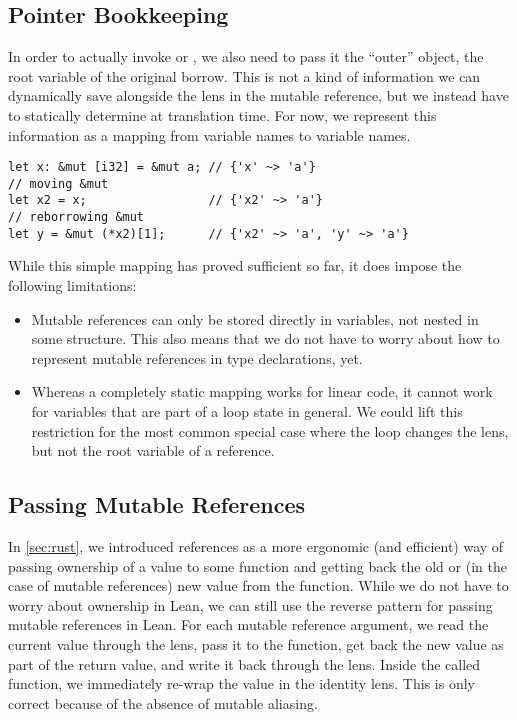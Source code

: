 \subsection{Pointer Bookkeeping}
\label{sec:book}

In order to actually invoke  or , we also need to
pass it the ``outer'' object, \ie the root variable of the original borrow. This
is not a kind of information we can dynamically save alongside the lens in the
mutable reference, but we instead have to statically determine at translation
time. For now, we represent this information as a mapping from variable names to
variable names.

\begin{verbatim}
let x: &mut [i32] = &mut a; // {'x' ~> 'a'}
// moving &mut
let x2 = x;                 // {'x2' ~> 'a'}
// reborrowing &mut
let y = &mut (*x2)[1];      // {'x2' ~> 'a', 'y' ~> 'a'}
\end{verbatim}

While this simple mapping has proved sufficient so far, it does impose
the following limitations:

\begin{itemize}
\item Mutable references can only be stored directly in variables, not nested in
  some structure. This also means that we do not have to worry about how to
  represent mutable references in type declarations, yet.
\item Whereas a completely static mapping works for linear code, it cannot work
  for variables that are part of a loop state in general. We could lift this
  restriction for the most common special case where the loop changes the lens,
  but not the root variable of a reference.
\end{itemize}

\subsection{Passing Mutable References}
\label{sec:passable}

In \autoref{sec:rust}, we introduced references as a more ergonomic (and
efficient) way of passing ownership of a value to some function and getting back the
old or (in the case of mutable references) new value from the function. While we
do not have to worry about ownership in Lean, we can still use the reverse pattern
for passing mutable references in Lean. For each mutable reference argument, we
read the current value through the lens, pass it to the function, get back the new
value as part of the return value, and write it back through the lens. Inside
the called function, we immediately re-wrap the value in the identity lens. This
is only correct because of the absence of mutable aliasing.

